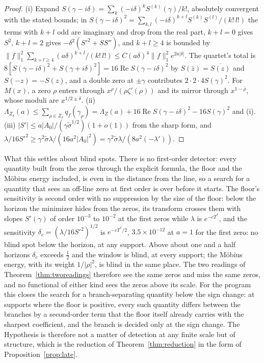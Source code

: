 \documentclass[11pt]{article}
\theoremstyle{definition}
\theoremstyle{remark}
\DeclareMathOperator{\Ree}{Re}
\newcommand{\Tst}{T^{*}}
\begin{document}
\begin{proof}
(i) Expand $S(\gamma-i\delta)=\sum_k(-i\delta)^kS^{(k)}(\gamma)/k!$, absolutely convergent with the stated bounds; in $S(\gamma-i\delta)^2=\sum_{k,l}(-i\delta)^{k+l}S^{(k)}S^{(l)}/(k!\,l!)$ the terms with $k+l$ odd are imaginary and drop from the real part, $k+l=0$ gives $S^2$, $k+l=2$ gives $-\delta^2(S'^2+SS'')$, and $k+l\ge4$ is bounded by $\|f\|_1^2\sum_{k+l\ge4}(a\delta)^{k+l}/(k!\,l!)\le C(a\delta)^4\|f\|_1^2e^{2a|\delta|}$. The quartet's total is $8[S(\gamma-i\delta)^2+S(\gamma+i\delta)^2]=16\Ree S(\gamma-i\delta)^2$ by $S(\bar z)=\overline{S(z)}$ and $S(-z)=-S(z)$, and a double zero at $\pm\gamma$ contributes $2\cdot2\cdot4S(\gamma)^2$. For $M(x)$, a zero $\rho$ enters through $x^\rho/(\rho\zeta'(\rho))$ and its mirror through $x^{1-\bar\rho}$, whose moduli are $x^{1/2\pm\delta}$. (ii) $\Lambda_{Z_\delta}(a)\le\sum_{\rho\in Z_\delta}q_f(\gamma_\rho)=\Lambda_Z(a)+16\Ree S(\gamma-i\delta)^2-16S(\gamma)^2$ and (i). (iii) $|S'|\le a|A_0|/(\gamma\tilde\sigma^{1/2})(1+o(1))$ from the sharp form, and $\lambda/16S'^2\ge\gamma^2\tilde\sigma\lambda/(16a^2|A_0|^2)=\gamma^2\tilde\sigma\lambda/(8a^2(-\lambda'))$.
\end{proof}

What this settles about blind spots. There is no first-order detector: every quantity built from the zeros through the explicit formula, the floor and the M\"obius energy included, is even in the distance from the line, so a search for a quantity that sees an off-line zero at first order is over before it starts. The floor's sensitivity is second order with no suppression by the size of the floor: below the horizon the minimizer hides from the zeros, its transform crosses them with slopes $S'(\gamma)$ of order $10^{-3}$ to $10^{-2}$ at the first zeros while $\lambda$ is $e^{-c\Tst}$, and the sensitivity $\delta_c=(\lambda/16S'^2)^{1/2}$ is $e^{-c\Tst/2}$, $3.5\times10^{-12}$ at $a=1$ for the first zero: no blind spot below the horizon, at any support. Above about one and a half horizons $\delta_c$ exceeds $\tfrac12$ and the window is blind, at every support; the M\"obius energy, with its weight $1/|\rho|^2$, is blind in the same place. The two readings of Theorem~\ref{thm:tworeadings} therefore see the same zeros and miss the same zeros, and no functional of either kind sees the zeros above its scale. For the program this closes the search for a branch-separating quantity below the sign change: at supports where the floor is positive, every such quantity differs between the branches by a second-order term that the floor itself already carries with the sharpest coefficient, and the branch is decided only at the sign change. The Hypothesis is therefore not a matter of detection at any finite scale but of structure, which is the reduction of Theorem~\ref{thm:reduction} in the form of Proposition~\ref{prop:late}.
\end{document}
